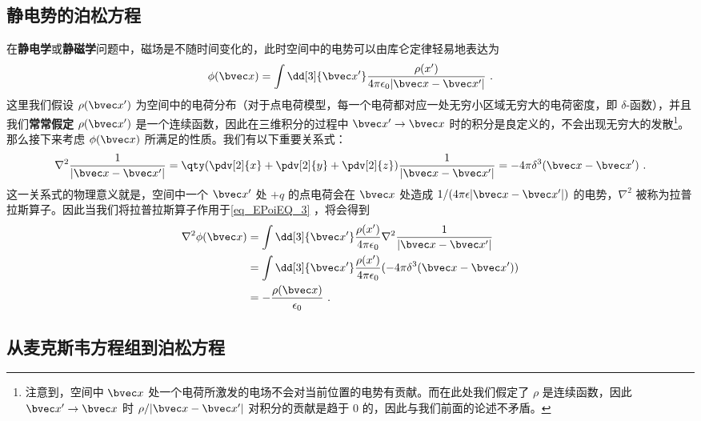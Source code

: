 

\subsection{静电势的泊松方程}
在\textbf{静电学}或\textbf{静磁学}问题中，磁场是不随时间变化的，此时空间中的电势可以由库仑定律轻易地表达为
\begin{equation}\label{eq_EPoiEQ_3}
\phi(\bvec x) = \int \dd[3]{\bvec x'} \frac{\rho(x')}{4\pi \epsilon_0|\bvec x-\bvec x'|}~.
\end{equation}
这里我们假设 $\rho(\bvec x')$ 为空间中的电荷分布（对于点电荷模型，每一个电荷都对应一处无穷小区域无穷大的电荷密度，即 $\delta$-函数），并且我们\textbf{常常假定} $\rho(\bvec x')$ 是一个连续函数，因此在三维积分的过程中 $\bvec x'\rightarrow \bvec x$ 时的积分是良定义的，不会出现无穷大的发散\footnote{注意到，空间中 $\bvec x$ 处一个电荷所激发的电场不会对当前位置的电势有贡献。而在此处我们假定了 $\rho$ 是连续函数，因此 $\bvec x'\rightarrow \bvec x$ 时 $\rho/|\bvec x-\bvec x'|$ 对积分的贡献是趋于 $0$ 的，因此与我们前面的论述不矛盾。}。那么接下来考虑 $\phi(\bvec x)$ 所满足的性质。我们有以下重要关系式：
\begin{equation}
\nabla^2 \frac{1}{|\bvec x-\bvec x'|} = \qty(\pdv[2]{x}+\pdv[2]{y}+\pdv[2]{z}) \frac{1}{|\bvec x-\bvec x'|}= -4\pi\delta^3(\bvec x-\bvec x')~.
\end{equation}
这一关系式的物理意义就是，空间中一个 $\bvec x'$ 处 $+q$ 的点电荷会在 $\bvec x$ 处造成 $1/(4\pi\epsilon |\bvec x-\bvec x'|)$ 的电势，$\nabla^2$ 被称为拉普拉斯算子。因此当我们将拉普拉斯算子作用于\autoref{eq_EPoiEQ_3} ，将会得到
\begin{equation}
\begin{aligned}
\nabla^2\phi(\bvec x) &= \int \dd[3]{\bvec x'}\frac{\rho(x')}{4\pi \epsilon_0} \nabla^2 \frac{1}{|\bvec x-\bvec x'|} \\
&= \int \dd[3]{\bvec x'}\frac{\rho(x')}{4\pi \epsilon_0} ( -4\pi\delta^3(\bvec x-\bvec x'))\\
&= -\frac{\rho(\bvec x)}{\epsilon_0}~.
\end{aligned}
\end{equation}

\subsection{从麦克斯韦方程组到泊松方程}
